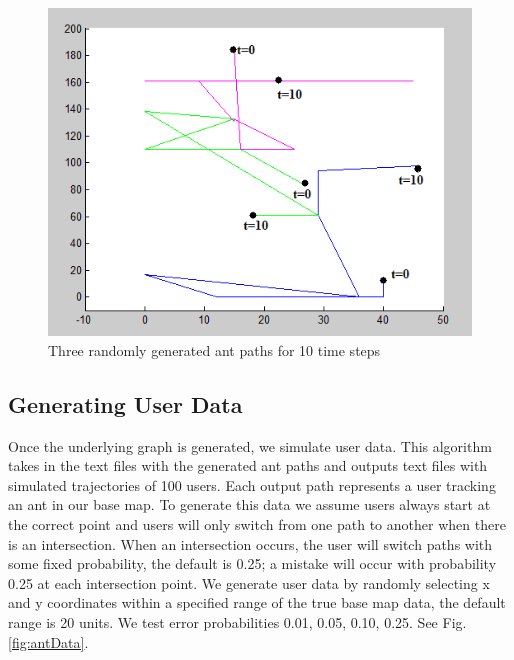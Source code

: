 \documentclass[12pt]{article}
\begin{document}
\begin{figure}[h!]
\centering
\includegraphics[width=4.5in]{GDataPlot3.png}
\caption{Three randomly generated ant paths for 10 time steps}
\label{fig:antPath}
\end{figure}


\subsection{Generating User Data}
Once the underlying graph is generated, we simulate user data. This algorithm takes in the text files with the generated ant paths and outputs text files with simulated trajectories of 100 users. Each output path represents a user tracking an ant in our base map. To generate this data we assume users always start at the correct point and users will only switch from one path to another when there is an intersection. When an intersection occurs, the user will switch paths with some fixed probability, the default is 0.25; a mistake will occur with probability 0.25 at each intersection point. We generate user data by randomly selecting x and y coordinates within a specified range of the true base map data, the default range is 20 units. We test error probabilities 0.01, 0.05, 0.10, 0.25. See Fig. \ref{fig:antData}.\\
\end{document}
